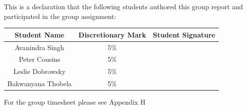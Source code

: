 \documentclass[12pt]{witseiepaper}
\begin{document}
This is a declaration that the following students authored this group report and participated in the group assignment: \\

\begin{table}[htb] \label{tbl:DEC} 
  \begin{center}
    \begin{tabular}
       {|c|c|c|} %
      \hline \textbf{Student Name} & \textbf{Discretionary Mark} & \textbf{Student Signature} \\[5ex]
      \hline Avanindra Singh &  5\% &   \\[5ex]
      \hline Peter Cousins & 5\% & \\[5ex]
      \hline Leslie Dobrowsky & 5\%& \\[5ex]
      \hline Bakwanyana Thobela & 5\% & \\[5ex]
      \hline 
    \end{tabular}
  \end{center}
\end{table}

For the group timesheet please see Appendix H



\end{document}

